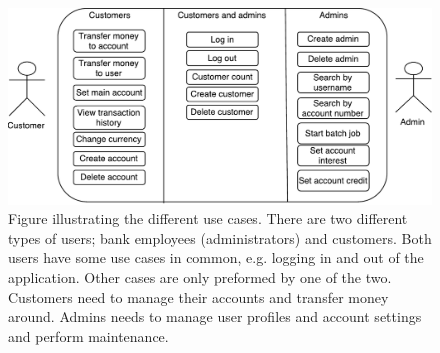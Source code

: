 \begin{figure}[H]
    \centering 
    \includegraphics[width=\textwidth]{figures/use_case_diagram_final.pdf}
    \caption{Figure illustrating the different use cases. There are two different types of users; bank employees (administrators) and customers. Both users have some use cases in common, e.g. logging in and out of the application. Other cases are only preformed by one of the two. Customers need to manage their accounts and transfer money around. Admins needs to manage user profiles and account settings and perform maintenance.}
    \label{fig:usecases}
\end{figure}